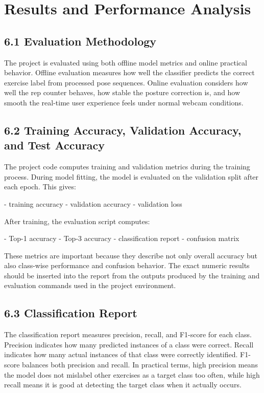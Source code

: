 \documentclass[12pt,a4paper]{report}
\begin{document}
\chapter{Results and Performance Analysis}

\section{6.1 Evaluation Methodology}
The project is evaluated using both offline model metrics and online practical behavior. Offline evaluation measures how well the classifier predicts the correct exercise label from processed pose sequences. Online evaluation considers how well the rep counter behaves, how stable the posture correction is, and how smooth the real-time user experience feels under normal webcam conditions.

\section{6.2 Training Accuracy, Validation Accuracy, and Test Accuracy}
The project code computes training and validation metrics during the training process. During model fitting, the model is evaluated on the validation split after each epoch. This gives:

- training accuracy  
- validation accuracy  
- validation loss

After training, the evaluation script computes:

- Top-1 accuracy  
- Top-3 accuracy  
- classification report  
- confusion matrix

These metrics are important because they describe not only overall accuracy but also class-wise performance and confusion behavior. The exact numeric results should be inserted into the report from the outputs produced by the training and evaluation commands used in the project environment.

\section{6.3 Classification Report}
The classification report measures precision, recall, and F1-score for each class. Precision indicates how many predicted instances of a class were correct. Recall indicates how many actual instances of that class were correctly identified. F1-score balances both precision and recall. In practical terms, high precision means the model does not mislabel other exercises as a target class too often, while high recall means it is good at detecting the target class when it actually occurs.
\end{document}
